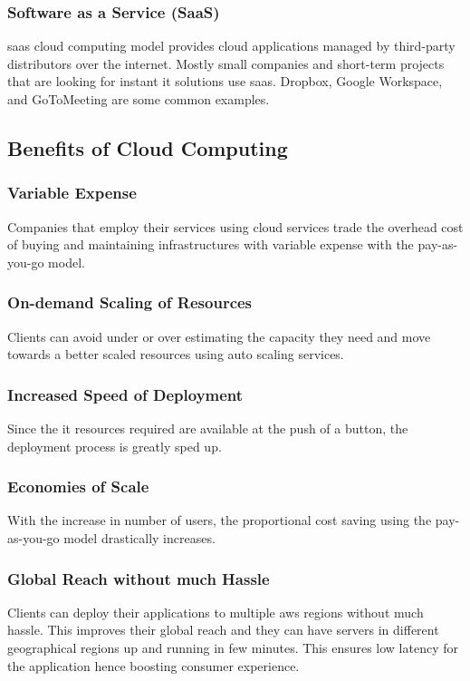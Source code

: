 \documentclass{home_assignment}
\begin{document}
\subsubsection{Software as a Service (SaaS)}
\acrfull{saas} cloud computing model provides cloud applications managed by third-party distributors over the internet. Mostly small companies and short-term projects that are looking for instant \acrshort{it} solutions use \acrshort{saas}. Dropbox, Google Workspace, and GoToMeeting are some common examples.
\subsection{Benefits of Cloud Computing}
\subsubsection{Variable Expense}
Companies that employ their services using cloud services trade the overhead cost of buying and maintaining infrastructures with variable expense with the pay-as-you-go model.

\subsubsection{On-demand Scaling of Resources}
Clients can avoid under or over estimating the capacity they need and move towards a better scaled resources using auto scaling services. 

\subsubsection{Increased Speed of Deployment}
Since the \acrshort{it} resources required are available at the push of a button, the deployment process is greatly sped up. 

\subsubsection{Economies of Scale}
With the increase in number of users, the proportional cost saving using the pay-as-you-go model drastically increases. 

\subsubsection{Global Reach without much Hassle}
Clients can deploy their applications to multiple \acrshort{aws} regions without much hassle. This improves their global reach and they can have servers in different geographical regions up and running in few minutes. This ensures low latency for the application hence boosting consumer experience. 
\end{document}
